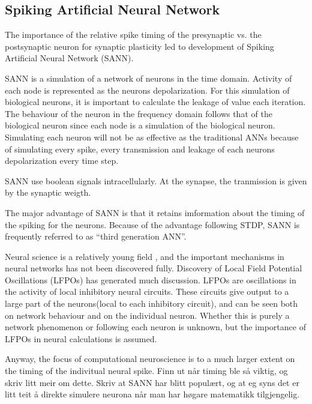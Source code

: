 \subsection{Spiking Artificial Neural Network}
The importance of the relative spike timing of the presynaptic vs. the postsynaptic neuron for synaptic plasticity led to development of Spiking Artificial Neural Network (SANN). 

SANN is a simulation of a network of neurons in the time domain. Activity of each node is represented as the neurons depolarization. For this simulation of biological neurons, it is important to calculate the leakage of value each iteration. 
The behaviour of the neuron in the frequency domain follows that of the biological neuron since each node is a simulation of the biological neuron. %
Simulating each neuron will not be as effective as the traditional ANNs because of simulating every spike, every transmission and leakage of each neurons depolarization every time step. 

SANN use boolean signals intracellularly. At the synapse, the tranmission is given by the synaptic weigth. 

The major advantage of SANN is that it retains imformation about the timing of the spiking for the neurons.  %
Because of the advantage following STDP, SANN is frequently referred to as ``third generation ANN''. 

Neural science is a relatively young field %
	, and the important mechanisms in neural networks has not been discovered fully. %
Discovery of Local Field Potential Oscillations (LFPOs) has generated much discussion. LFPOs are oscillations in the activity of local inhibitory neural circuits. 
These circuits give output to a large part of the neurons(local to each inhibitory circuit), and can be seen both on network behaviour and on the individual neuron. 
Whether this is purely a network phenomenon or following each neuron is unknown, but the importance of LFPOs in neural calculations is assumed. %

Anyway, the focus of computational neuroscience is to a much larger extent on the timing of the indivitual neural spike. 
Finn ut når timing ble så viktig, og skriv litt meir om dette. Skriv at SANN har blitt populært, og at eg syns det er litt teit å direkte simulere neurona når man har høgare matematikk tilgjengelig.



